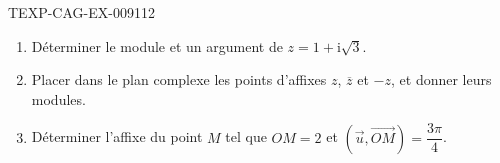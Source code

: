 \begin{exercice}{TEXP-CAG-EX-009}{1}{12}
\begin{enumerate}
  \item Déterminer le module et un argument de $z=1+\mathrm{i}\sqrt{3}$.
  \item Placer dans le plan complexe les points d'affixes $z$, $\overline{z}$
        et $-z$, et donner leurs modules.
  \item Déterminer l'affixe du point $M$ tel que $OM=2$ et
        $(\vec{u},\overrightarrow{OM})=\dfrac{3\pi}{4}$.
\end{enumerate}
\end{exercice}
